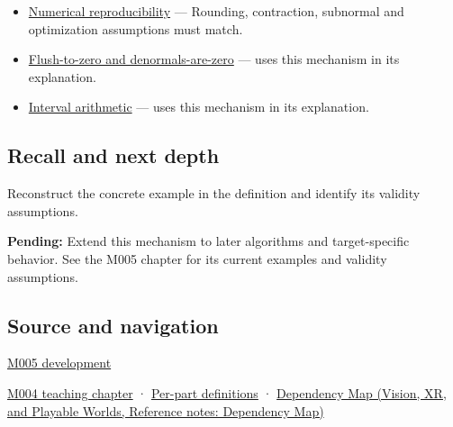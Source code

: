 \begin{itemize}
\item
  \hyperref[appendix-5f1a2c3f97ff]{Numerical reproducibility} --- Rounding, contraction, subnormal and optimization assumptions must match.
\item
  \hyperref[appendix-e979eb012782]{Flush-to-zero and denormals-are-zero} --- uses this mechanism in its explanation.
\item
  \hyperref[appendix-1823a14330cb]{Interval arithmetic} --- uses this mechanism in its explanation.
\end{itemize}

\subsection{Recall and next depth}\label{appendix-f11d1a521253-recall-and-next-depth}

Reconstruct the concrete example in the definition and identify its validity assumptions.

\textbf{Pending:} Extend this mechanism to later algorithms and target-specific behavior. See the M005 chapter for its current examples and validity assumptions.

\subsection{Source and navigation}\label{appendix-f11d1a521253-source-and-navigation}

\hyperref[01-foundations-i-ch001-when-arithmetic-meets-uncertainty]{M005 development}

\hyperref[01-foundations-i-ch001-a-stretching-ruler-for-real-valued-quantities]{M004 teaching chapter} · \hyperref[appendix-fd090d982a15-m004---parts-61-76]{Per-part definitions} · \href{../07-Vision-XR-and-Playable-Worlds/main.pdf\#nameddest=appendix-4ad47bdd269a}{Dependency Map (Vision, XR, and Playable Worlds, Reference notes: Dependency Map)}
